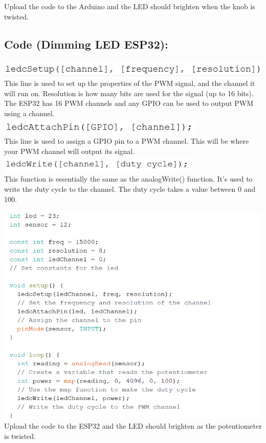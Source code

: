 \documentclass[a4paper,12pt]{report}
\newcommand{\diagramWidth}{150mm}
\begin{document}
        Upload the code to the Arduino and the LED should brighten when the knob is twisted.

    \newpage
    \subsection*{Code (Dimming LED ESP32):}
    \begin{mdframed}[linewidth = 3, linecolor = turbo_purple]
        \includegraphics[height = 8mm]{Assets/ledcsetup.png} \\
         This line is used to set up the properties of the PWM signal, and the channel it will run on. Resolution is how many bits are used for the signal (up to 16 bits). The ESP32 has 16 PWM channels and any GPIO can be used to output PWM using a channel. \\
         \includegraphics[height = 8mm]{Assets/ledcattach.png} \\ 
         This line is used to assign a GPIO pin to a PWM channel. This will be where your PWM channel will output its signal. \\
         \includegraphics[height = 8mm]{Assets/ledcwrite.png} \\ 
         This function is essentially the same as the analogWrite() function. It’s used to write the duty cycle to the channel. The duty cycle takes a value between 0 and 100.  \\
    \end{mdframed}
    \includegraphics[width = \diagramWidth]{Assets/esp_pot.png} \\
    Upload the code to the ESP32 and the LED should brighten as the potentiometer is twisted. 
\end{document}
